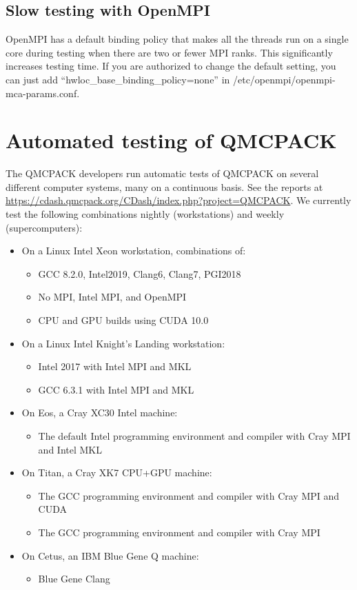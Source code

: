\subsection{Slow testing with OpenMPI}
OpenMPI has a default binding policy that makes all the threads run on a single core during testing when there are two or fewer MPI ranks.
This significantly increases testing time. If you are authorized to change the default setting, you can just add ``hwloc\_base\_binding\_policy=none'' in /etc/openmpi/openmpi-mca-params.conf.

\section{Automated testing of QMCPACK}

The QMCPACK developers run automatic tests of QMCPACK on several
different computer systems,  many on a continuous basis. See the reports at
\url{https://cdash.qmcpack.org/CDash/index.php?project=QMCPACK}.
We currently test
the following combinations nightly (workstations) and weekly (supercomputers):

\begin{itemize}
\item On a Linux Intel Xeon workstation, combinations of:
  \begin{itemize}
  \item GCC 8.2.0, Intel2019, Clang6, Clang7, PGI2018
  \item No MPI, Intel MPI, and OpenMPI
  \item CPU and GPU builds using CUDA 10.0
  \end{itemize}
\item On a Linux Intel Knight's Landing workstation:
  \begin{itemize}
  \item Intel 2017 with Intel MPI and MKL
  \item GCC 6.3.1 with Intel MPI and MKL
  \end{itemize}
\item On Eos, a Cray XC30 Intel machine:
  \begin{itemize}
\item The default Intel programming environment and compiler with Cray MPI and Intel MKL
  \end{itemize}
\item On Titan, a Cray XK7 CPU+GPU machine:
  \begin{itemize}
  \item The GCC programming environment and compiler with Cray MPI and CUDA
  \item The GCC programming environment and compiler with Cray MPI
  \end{itemize}
\item On Cetus, an IBM Blue Gene Q machine:
\begin{itemize}
\item Blue Gene Clang
\end{itemize}
\end{itemize}

